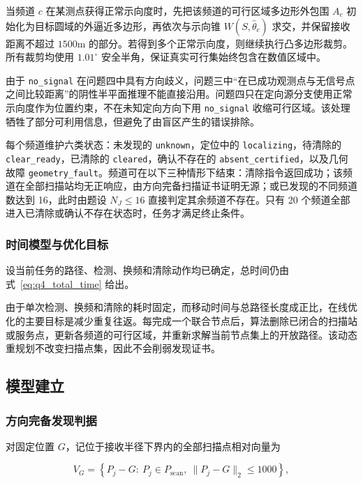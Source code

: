 当频道 $c$ 在某测点获得正常示向度时，先把该频道的可行区域多边形外包围 $A_c$ 初始化为目标圆域的外逼近多边形，再依次与示向锥 $W(S,\hat\theta_c)$ 求交，并保留接收距离不超过 $1500\mathrm{m}$ 的部分。若得到多个正常示向度，则继续执行凸多边形裁剪\cite{sutherland1974}。所有裁剪均使用 $1.01^\circ$ 安全半角，保证真实可行集始终包含在数值区域中。

由于 \texttt{no\_signal} 在问题四中具有方向歧义，问题三中“在已成功观测点与无信号点之间比较距离”的阴性半平面推理不能直接沿用。问题四只在定向源分支使用正常示向度作为位置约束，不在未知定向方向下用 \texttt{no\_signal} 收缩可行区域。该处理牺牲了部分可利用信息，但避免了由盲区产生的错误排除。

每个频道维护六类状态：未发现的 \texttt{unknown}，定位中的 \texttt{localizing}，待清除的 \texttt{clear\_ready}，已清除的 \texttt{cleared}，确认不存在的 \texttt{absent\_certified}，以及几何故障 \texttt{geometry\_fault}。频道可在以下三种情形下结束：清除指令返回成功；该频道在全部扫描站均无正响应，由方向完备扫描证书证明无源；或已发现的不同频道数达到 16，此时由题设 $N_J\le16$ 直接判定其余频道不存在。只有 20 个频道全部进入已清除或确认不存在状态时，任务才满足终止条件。

\subsubsection{时间模型与优化目标}

设当前任务的路径、检测、换频和清除动作均已确定，总时间仍由式~\eqref{eq:q4_total_time} 给出。

由于单次检测、换频和清除的耗时固定，而移动时间与总路径长度成正比，在线优化的主要目标是减少重复往返。每完成一个联合节点后，算法删除已闭合的扫描站或服务点，更新各频道的可行区域，并重新求解当前节点集上的开放路径。该动态重规划不改变扫描点集，因此不会削弱发现证书。

\subsection{模型建立}

\subsubsection{方向完备发现判据}

对固定位置 $G$，记位于接收半径下界内的全部扫描点相对向量为

\begin{equation}
V_G=
\left\{
P_j-G:
\ P_j\in P_{\mathrm{scan}},\ 
\lVert P_j-G\rVert_2\le1000
\right\},
\label{eq:q4_relative_set}
\end{equation}

